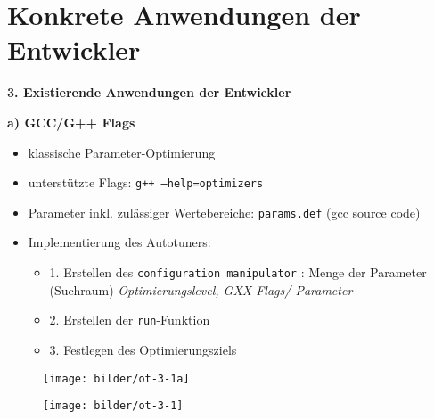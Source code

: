     \section{Konkrete Anwendungen der Entwickler}
    
    \begin{frame}
    \textbf{3. Existierende Anwendungen der Entwickler} \newline
      
    \textbf{a) GCC/G++ Flags}
      \begin{itemize}
        \item klassische Parameter-Optimierung
        \item unterstützte Flags: \texttt{g++ --help=optimizers}
        \item Parameter inkl. zulässiger Wertebereiche: \texttt{params.def} (gcc source code)
        \item Implementierung des Autotuners:
        \begin{itemize}
          \item 1. Erstellen des \texttt{configuration manipulator} : Menge der Parameter (Suchraum) \newline
          \emph{Optimierungslevel, GXX-Flags/-Parameter}
          \item 2. Erstellen der \texttt{run}-Funktion
          \item 3. Festlegen des Optimierungsziels
        \end{itemize}
      \end{itemize}
    \end{frame}
        
  \begin{frame}
    \begin{figure}[ht]
      \centering	      
      \texttt{[image: bilder/ot-3-1a]}
      \label{gccpy1a}
    \end{figure}
  \end{frame}
  
  
  \begin{frame}
    \begin{figure}[ht]
      \centering	      
      \texttt{[image: bilder/ot-3-1]}
      \label{gccpy1}
    \end{figure}
  \end{frame}
  
